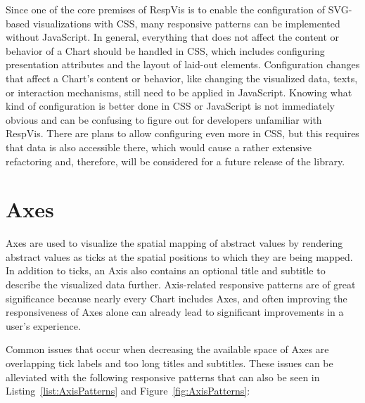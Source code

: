 Since one of the core premises of RespVis is to enable the configuration of SVG-based visualizations with CSS, many responsive patterns can be implemented without JavaScript.
In general, everything that does not affect the content or behavior of a Chart should be handled in CSS, which includes configuring presentation attributes and the layout of laid-out elements.
Configuration changes that affect a Chart's content or behavior, like changing the visualized data, texts, or interaction mechanisms, still need to be applied in JavaScript.
Knowing what kind of configuration is better done in CSS or JavaScript is not immediately obvious and can be confusing to figure out for developers unfamiliar with RespVis.
There are plans to allow configuring even more in CSS, but this requires that data is also accessible there, which would cause a rather extensive refactoring and, therefore, will be considered for a future release of the library.

\section{Axes}
\label{sec:AxesUsage}

Axes are used to visualize the spatial mapping of abstract values by rendering abstract values as ticks at the spatial positions to which they are being mapped.
In addition to ticks, an Axis also contains an optional title and subtitle to describe the visualized data further.
Axis-related responsive patterns are of great significance because nearly every Chart includes Axes, and often improving the responsiveness of Axes alone can already lead to significant improvements in a user's experience.

Common issues that occur when decreasing the available space of Axes are overlapping tick labels and too long titles and subtitles.
These issues can be alleviated with the following responsive patterns that  can also be seen in Listing~\ref{list:AxisPatterns} and Figure~\ref{fig:AxisPatterns}:

